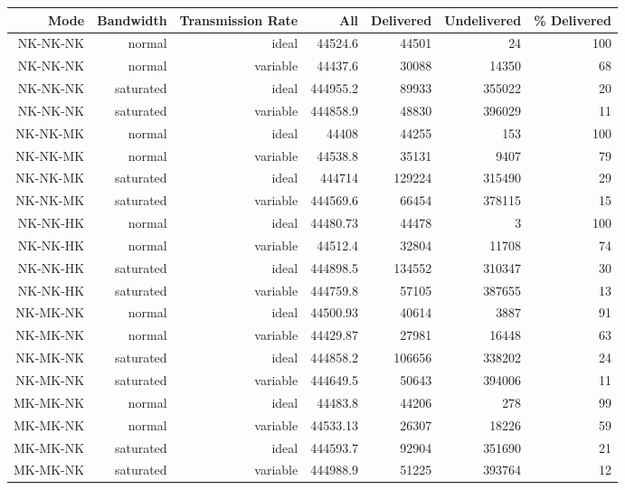 \begin{landscape}
\begin{table}[htbp]
    \begin{tabular}{rrrrrrr}

    \toprule
    Mode  & Bandwidth & Transmission Rate & All   & Delivered & Undelivered & \% Delivered \\
    \midrule
    NK-NK-NK & normal & ideal & 44524.6 & 44501 & 24    & 100 \\
    NK-NK-NK & normal & variable & 44437.6 & 30088 & 14350 & 68 \\
    NK-NK-NK & saturated & ideal & 444955.2 & 89933 & 355022 & 20 \\
    NK-NK-NK & saturated & variable & 444858.9 & 48830 & 396029 & 11 \\
\rowcolor{Gray}    
    NK-NK-MK & normal & ideal & 44408 & 44255 & 153   & 100 \\
\rowcolor{Gray}
    NK-NK-MK & normal & variable & 44538.8 & 35131 & 9407  & 79 \\
\rowcolor{Gray}
    NK-NK-MK & saturated & ideal & 444714 & 129224 & 315490 & 29 \\
\rowcolor{Gray}
    NK-NK-MK & saturated & variable & 444569.6 & 66454 & 378115 & 15 \\
    NK-NK-HK & normal & ideal & 44480.73 & 44478 & 3     & 100 \\
    NK-NK-HK & normal & variable & 44512.4 & 32804 & 11708 & 74 \\
    NK-NK-HK & saturated & ideal & 444898.5 & 134552 & 310347 & 30 \\
    NK-NK-HK & saturated & variable & 444759.8 & 57105 & 387655 & 13 \\
\rowcolor{Gray}
    NK-MK-NK & normal & ideal & 44500.93 & 40614 & 3887  & 91 \\
\rowcolor{Gray}
    NK-MK-NK & normal & variable & 44429.87 & 27981 & 16448 & 63 \\
\rowcolor{Gray}
    NK-MK-NK & saturated & ideal & 444858.2 & 106656 & 338202 & 24 \\
\rowcolor{Gray}
    NK-MK-NK & saturated & variable & 444649.5 & 50643 & 394006 & 11 \\
    MK-MK-NK & normal & ideal & 44483.8 & 44206 & 278   & 99 \\
    MK-MK-NK & normal & variable & 44533.13 & 26307 & 18226 & 59 \\
    MK-MK-NK & saturated & ideal & 444593.7 & 92904 & 351690 & 21 \\
    MK-MK-NK & saturated & variable & 444988.9 & 51225 & 393764 & 12 \\

\end{tabular}
\end{table}
\end{landscape}
